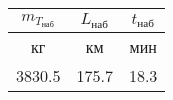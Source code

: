 \begin{tabular}{|c|c|c|}
\hline
$m_{T_{наб}}$ & $L_{наб}$ & $t_{наб}$ \\ 
\hline
кг & км & мин \\ 
\hline
3830.5 & 175.7 & 18.3 \\ 
\hline
\end{tabular}